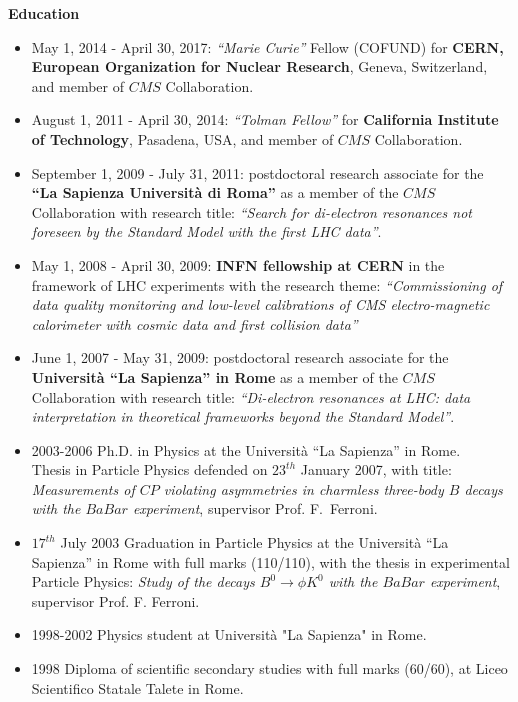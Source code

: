 \documentclass[11pt,twoside,a4paper]{article}
\begin{document}
\begin{center}
{\bf{Education}}
\end{center}
\begin{itemize}

\item May 1, 2014 - April 30, 2017: {\it ``Marie Curie''} Fellow
  (COFUND) for {\bf CERN, European Organization for Nuclear Research},
  Geneva, Switzerland, and member of $CMS$ Collaboration.

\item August 1, 2011 - April 30, 2014: {\it ``Tolman Fellow''} for {\bf
  California Institute of Technology}, Pasadena, USA, and
  member of $CMS$ Collaboration.

\item September 1, 2009 - July 31, 2011: postdoctoral research
  associate for the {\bf ``La Sapienza Universit\`a di Roma''} as a member
  of the $CMS$ Collaboration with research title: {\it ``Search for
    di-electron resonances not foreseen by the Standard Model with the
    first LHC data''}.

\item May 1, 2008 - April 30, 2009: {\bf INFN fellowship at CERN} in
  the framework of LHC experiments with the research theme: {\it
    ``Commissioning of data quality monitoring and low-level
    calibrations of CMS electro-magnetic calorimeter with cosmic data
    and first collision data''}

\item June 1, 2007 - May 31, 2009: postdoctoral research associate for
  the {\bf Universit\`a ``La Sapienza'' in Rome} as a member of the
  $CMS$ Collaboration with research title: {\it ``Di-electron
    resonances at LHC: data interpretation in theoretical frameworks
    beyond the Standard Model''}.

\item 2003-2006 Ph.D. in Physics at the Universit\`a ``La Sapienza''
  in Rome.\\ Thesis in Particle Physics defended on $23^{th}$ January
  2007, with title: {\it Measurements of $CP$ violating asymmetries in
    charmless three-body $B$ decays with the $BaBar$ experiment},
  supervisor Prof. F.~Ferroni.

\item $17^{th}$ July 2003 Graduation in Particle Physics at the
  Universit\`a ``La Sapienza'' in Rome with full marks (110/110), with
  the thesis in experimental Particle Physics: {\it Study of the
    decays $B^0 \rightarrow \phi K^0$ with the $BaBar$ experiment},
  supervisor Prof. F. Ferroni.

\item 1998-2002  Physics student at  Universit\`a  "La Sapienza" in Rome.

\item 1998    Diploma of scientific secondary studies with full marks (60/60),
  at Liceo Scientifico Statale Talete in Rome.

\end{itemize}
\end{document}
